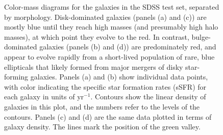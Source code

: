 \documentclass[twocolumn]{aastex63}
\begin{document}
\begin{figure}[htbp]
\begin{center}
\begin{tabular}{ll}
    \end{tabular}
  \end{center}
  \caption{Color-mass diagrams for the galaxies in the SDSS test set, separated by morphology. Disk-dominated galaxies (panels (a) and (c)) are mostly blue until they reach high masses (and presumably high halo masses), at which point they evolve to the red. In contrast, bulge-dominated galaxies (panels (b) and (d)) are predominately red, and appear to evolve rapidly from a short-lived population of rare, blue ellipticals that likely formed from major mergers of disky star-forming galaxies. Panels (a) and (b) show individual data points, with color indicating the specific star formation rates (sSFR) for each galaxy in units of yr$^{-1}$. Contours show the linear density of galaxies in this plot, and the numbers refer to the levels of the contours. Panels (c) and (d) are the same data plotted in terms of galaxy density. The lines mark the position of the green valley.}
  \label{fig:sdss_cmd}
\end{figure}
\end{document}

